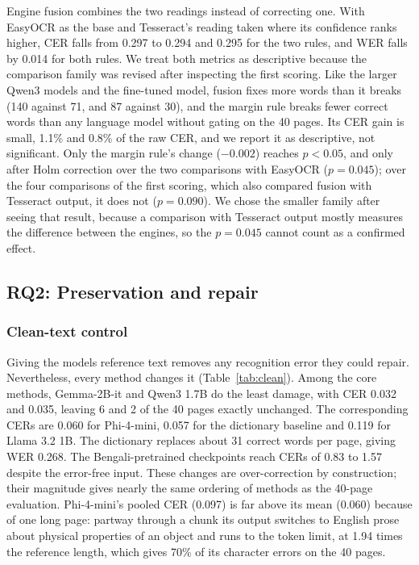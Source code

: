\documentclass[conference]{IEEEtran}
\begin{document}
Engine fusion combines the two readings instead of correcting one. With EasyOCR as the base and Tesseract's reading taken where its confidence ranks higher, CER falls from 0.297 to 0.294 and 0.295 for the two rules, and WER falls by 0.014 for both rules. We treat both metrics as descriptive because the comparison family was revised after inspecting the first scoring. Like the larger Qwen3 models and the fine-tuned model, fusion fixes more words than it breaks (140 against 71, and 87 against 30), and the margin rule breaks fewer correct words than any language model without gating on the 40 pages. Its CER gain is small, 1.1\% and 0.8\% of the raw CER, and we report it as descriptive, not significant. Only the margin rule's change ($-0.002$) reaches $p<0.05$, and only after Holm correction over the two comparisons with EasyOCR ($p=0.045$); over the four comparisons of the first scoring, which also compared fusion with Tesseract output, it does not ($p=0.090$). We chose the smaller family after seeing that result, because a comparison with Tesseract output mostly measures the difference between the engines, so the $p=0.045$ cannot count as a confirmed effect.



\subsection{RQ2: Preservation and repair}
\label{sec:rq2}

\subsubsection{Clean-text control}
\label{sec:clean}
Giving the models reference text removes any recognition error they could repair. Nevertheless, every method changes it (Table~\ref{tab:clean}). Among the core methods, Gemma-2B-it and Qwen3 1.7B do the least damage, with CER 0.032 and 0.035, leaving 6 and 2 of the 40 pages exactly unchanged. The corresponding CERs are 0.060 for Phi-4-mini, 0.057 for the dictionary baseline and 0.119 for Llama 3.2 1B. The dictionary replaces about 31 correct words per page, giving WER 0.268. The Bengali-pretrained checkpoints reach CERs of 0.83 to 1.57 despite the error-free input. These changes are over-correction by construction; their magnitude gives nearly the same ordering of methods as the 40-page evaluation. Phi-4-mini's pooled CER (0.097) is far above its mean (0.060) because of one long page: partway through a chunk its output switches to English prose about physical properties of an object and runs to the token limit, at 1.94 times the reference length, which gives 70\% of its character errors on the 40 pages.
\end{document}
